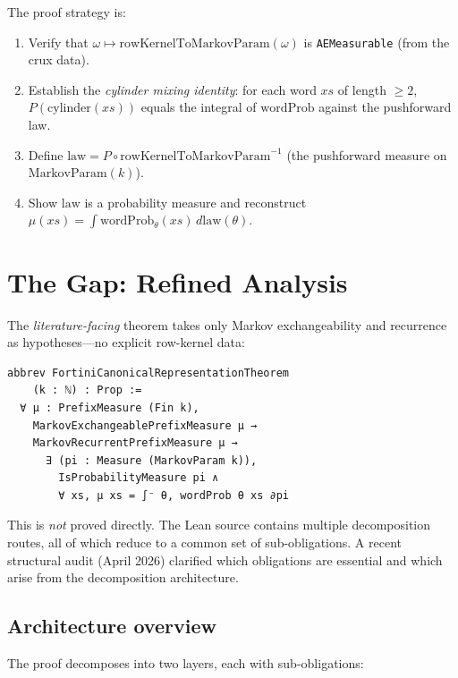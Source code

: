 \documentclass[11pt]{article}
\theoremstyle{definition}
\begin{document}
The proof strategy is:
\begin{enumerate}[leftmargin=2em]
\item Verify that $\omega \mapsto \mathrm{rowKernelToMarkovParam}(\omega)$
  is \texttt{AEMeasurable} (from the crux data).
\item Establish the \emph{cylinder mixing identity}: for each word $xs$ of
  length $\ge 2$, $P(\mathrm{cylinder}(xs))$ equals the integral of
  $\mathrm{wordProb}$ against the pushforward law.
\item Define $\mathrm{law} = P \circ \mathrm{rowKernelToMarkovParam}^{-1}$
  (the pushforward measure on $\mathrm{MarkovParam}(k)$).
\item Show $\mathrm{law}$ is a probability measure and reconstruct
  $\mu(xs) = \int \mathrm{wordProb}_\theta(xs)\, d\mathrm{law}(\theta)$.
\end{enumerate}

\section{The Gap: Refined Analysis}
\label{sec:gap}

The \emph{literature-facing} theorem takes only Markov exchangeability and
recurrence as hypotheses---no explicit row-kernel data:

\begin{lstlisting}
abbrev FortiniCanonicalRepresentationTheorem
    (k : ℕ) : Prop :=
  ∀ μ : PrefixMeasure (Fin k),
    MarkovExchangeablePrefixMeasure μ →
    MarkovRecurrentPrefixMeasure μ →
      ∃ (pi : Measure (MarkovParam k)),
        IsProbabilityMeasure pi ∧
        ∀ xs, μ xs = ∫⁻ θ, wordProb θ xs ∂pi
\end{lstlisting}

This is \emph{not} proved directly.  The Lean source contains multiple
decomposition routes, all of which reduce to a common set of sub-obligations.
A recent structural audit (April 2026) clarified which obligations are
essential and which arise from the decomposition architecture.

\subsection{Architecture overview}

The proof decomposes into two layers, each with sub-obligations:
\end{document}
